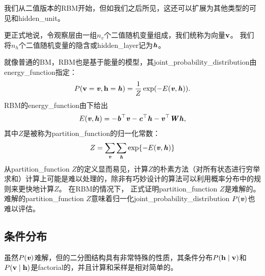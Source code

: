 
我们从二值版本的\gls{RBM}开始，但如我们之后所见，这还可以扩展为其他类型的可见和\gls{hidden_unit}。

更正式地说，令观察层由一组$n_v$个二值随机变量组成，我们统称为向量$\mathbf{v}$。
我们将$n_h$个二值随机变量的隐含或\gls{hidden_layer}记为$\boldsymbol{\mathit{h}}$。

就像普通的\gls{BM}，\gls{RBM}也是基于能量的模型，其\gls{joint_probability_distribution}由\gls{energy_function}指定：
\begin{align}
 P(\mathbf{v} = \boldsymbol{\mathit{v}}, \mathbf{h} = \boldsymbol{\mathit{h}}) = \frac{1}{Z} \exp(-E(\boldsymbol{\mathit{v}}, \boldsymbol{\mathit{h}})).
\end{align}
RBM的\gls{energy_function}由下给出
\begin{align} \label{eq:205e}
 E(\boldsymbol{\mathit{v}}, \boldsymbol{\mathit{h}}) = -\boldsymbol{\mathit{b}}^\top \boldsymbol{\mathit{v}} - \boldsymbol{\mathit{c}}^\top \boldsymbol{\mathit{h}} - \boldsymbol{\mathit{v}}^\top \boldsymbol{\mathit{W}} \boldsymbol{\mathit{h}},
\end{align}
其中$Z$是被称为\gls{partition_function}的归一化常数：
\begin{align}
 Z = \sum_{\boldsymbol{\mathit{v}}} \sum_{\boldsymbol{\mathit{h}}} \exp \{-E(\boldsymbol{\mathit{v}}, \boldsymbol{\mathit{h}}) \}
\end{align}
从\gls{partition_function} $Z$的定义显而易见，计算$Z$的朴素方法（对所有状态进行穷举求和）计算上可能是难以处理的，除非有巧妙设计的算法可以利用概率分布中的规则来更快地计算$Z$。
在\gls{RBM}的情况下， \citet{long10rbm}正式证明\gls{partition_function} $Z$是难解的。
难解的\gls{partition_function} $Z$意味着归一化\gls{joint_probability_distribution} $P(\boldsymbol{\mathit{v}})$也难以评估。


\subsection{条件分布}
\label{sec:conditional_distributions_chap20}
虽然$P(\boldsymbol{\mathit{v}})$难解，但的二分图结构具有非常特殊的性质，其条件分布$P(\mathbf{h} \mid \mathbf{v})$和$P(\mathbf{v}\mid\mathbf{h})$是\gls{factorial}的，并且计算和采样是相对简单的。


